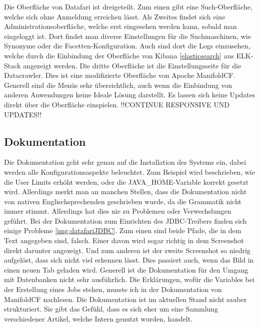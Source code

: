 Die Oberfläche von Datafari ist dreigeteilt. Zum einen gibt eine Such-Oberfläche, welche sich ohne Anmeldung erreichen lässt. Als Zweites findet sich eine Administrationsoberfläche, welche erst eingesehen werden kann, sobald man eingeloggt ist. Dort findet man diverse Einstellungen für die Suchmaschinen, wie Synonyme oder die Facetten-Konfiguration. Auch sind dort die Logs einzusehen, welche durch die Einbindung der Oberfläche von Kibana \ref{elasticsearch} aus ELK-Stack angezeigt werden. Die dritte Oberfläche ist die Einstellungsseite für die Datacrawler. Dies ist eine modifizierte Oberfläche von Apache ManifoldCF. Generell sind die Menüs sehr übersichtlich, auch wenn die Einbindung von anderen Anwendungen keine Ideale Lösung darstellt. Es lassen sich keine Updates direkt über die Oberfläche einspielen.
!!CONTINUE RESPONSIVE UND UPDATES!!

\subsection{Dokumentation}

Die Dokumentation geht sehr genau auf die Installation des Systems ein, dabei werden alle Konfigurationsaspekte beleuchtet. Zum Beispiel wird beschrieben, wie die User Limits erhöht werden, oder die JAVA\_HOME-Variable korrekt gesetzt wird. Allerdings merkt man an manchen Stellen, dass die Dokumentation nicht von nativen Englischsprechenden geschrieben wurde, da die Grammatik nicht immer stimmt. Allerdings hat dies nie zu Problemen oder Verwechslungen geführt.
Bei der Dokumentation zum Einrichten des JDBC-Treibers finden sich einige Probleme \ref{img:datafariJDBC}. Zum einen sind beide Pfade, die in dem Text angegeben sind, falsch. Einer davon wird sogar richtig in dem Screenshot direkt darunter angezeigt. Und zum anderen ist der zweite Screenshot so niedrig aufgelöst, dass sich nicht viel erkennen lässt. Dies passiert auch, wenn das Bild in einen neuen Tab geladen wird. Generell ist die Dokumentation für den Umgang mit Datenbanken nicht sehr ausführlich. Die Erklärungen, wofür die Variables bei der Erstellung eines Jobs stehen, musste ich in der Dokumentation von ManifoldCF nachlesen.
Die Dokumentation ist im aktuellen Stand nicht sauber strukturiert. Sie gibt das Gefühl, dass es sich eher um eine Sammlung verschiedener Artikel, welche Intern genutzt wurden, handelt.

